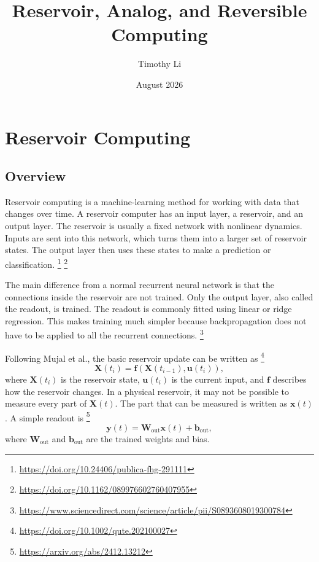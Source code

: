 \documentclass{article}
\title{Reservoir, Analog, and Reversible Computing}
\author{Timothy Li}
\date{August 2026}
\begin{document}
\maketitle

\section{Reservoir Computing}

\subsection{Overview}

Reservoir computing is a machine-learning method for working with data that changes over time. A reservoir computer has an input layer, a reservoir, and an output layer. The reservoir is usually a fixed network with nonlinear dynamics. Inputs are sent into this network, which turns them into a larger set of reservoir states. The output layer then uses these states to make a prediction or classification.
\footnote{\url{https://doi.org/10.24406/publica-fhg-291111}}
\footnote{\url{https://doi.org/10.1162/089976602760407955}}

The main difference from a normal recurrent neural network is that the connections inside the reservoir are not trained. Only the output layer, also called the readout, is trained. The readout is commonly fitted using linear or ridge regression. This makes training much simpler because backpropagation does not have to be applied to all the recurrent connections.
\footnote{\url{https://www.sciencedirect.com/science/article/pii/S0893608019300784}}

Following Mujal et al., the basic reservoir update can be written as
\footnote{\url{https://doi.org/10.1002/qute.202100027}}
\begin{equation}
    \mathbf{X}(t_i)
    =
    \mathbf{f}\!\left(\mathbf{X}(t_{i-1}),\mathbf{u}(t_i)\right),
\end{equation}
where $\mathbf{X}(t_i)$ is the reservoir state, $\mathbf{u}(t_i)$ is the current input, and $\mathbf{f}$ describes how the reservoir changes. In a physical reservoir, it may not be possible to measure every part of $\mathbf{X}(t)$. The part that can be measured is written as $\mathbf{x}(t)$. A simple readout is
\footnote{\url{https://arxiv.org/abs/2412.13212}}
\begin{equation}
    \mathbf{y}(t)
    =
    \mathbf{W}_{\mathrm{out}}\mathbf{x}(t)
    +
    \mathbf{b}_{\mathrm{out}},
\end{equation}
where $\mathbf{W}_{\mathrm{out}}$ and $\mathbf{b}_{\mathrm{out}}$ are the trained weights and bias.
\end{document}
